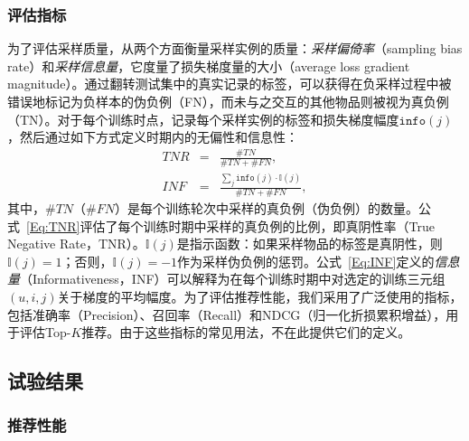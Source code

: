 \subsubsection{评估指标}
为了评估采样质量，从两个方面衡量采样实例的质量：\textit{采样偏倚率}（sampling bias rate）和\textit{采样信息量}，它度量了损失梯度量的大小（average loss gradient magnitude）。通过翻转测试集中的真实记录的标签，可以获得在负采样过程中被错误地标记为负样本的伪负例（FN），而未与之交互的其他物品则被视为真负例（TN）。对于每个训练时点，记录每个采样实例的标签和损失梯度幅度$\mathtt{info}(j)$，然后通过如下方式定义时期内的无偏性和信息性：
\begin{eqnarray}
	TNR &=& \frac{\#TN}{\#TN+ \#FN}, \label{Eq:TNR}\\
	INF &=& \frac{ \sum_j \mathtt{info}(j) \cdot \mathbb I(j)}{\#TN+ \#FN}, \label{Eq:INF}
\end{eqnarray}
其中，$\#TN$（$\#FN$）是每个训练轮次中采样的真负例（伪负例）的数量。公式~\eqref{Eq:TNR}评估了每个训练时期中采样的真负例的比例，即真阴性率（True Negative Rate，TNR）。$\mathbb I(j)$是指示函数：如果采样物品的标签是真阴性，则$\mathbb I(j)=1$；否则，$\mathbb I(j)=-1$作为采样伪负例的惩罚。公式~\eqref{Eq:INF}定义的\textit{信息量}（Informativeness，INF）可以解释为在每个训练时期中对选定的训练三元组$(u,i,j)$关于梯度的平均幅度。为了评估推荐性能，我们采用了广泛使用的指标，包括准确率（Precision）、召回率（Recall）和NDCG（归一化折损累积增益），用于评估Top-$K$推荐。由于这些指标的常见用法，不在此提供它们的定义。
\subsection{试验结果}
\subsubsection{推荐性能}




